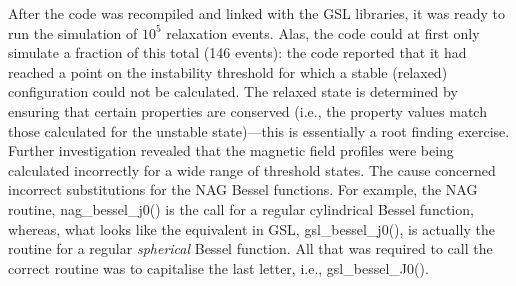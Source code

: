 After the code was recompiled and linked with the GSL libraries, it was ready to run the simulation of $10^5$ relaxation events. Alas, the code could at first only simulate a fraction of this total (146 events): the code reported that it had reached a point on the instability threshold for which a stable (relaxed) configuration could not be calculated. The relaxed state is determined by ensuring that certain properties are conserved (i.e., the property values match those calculated for the unstable state)---this is essentially a root finding exercise. Further investigation revealed that the magnetic field profiles were being calculated incorrectly for a wide range of threshold states. The cause concerned incorrect substitutions for the NAG Bessel functions. For example, the NAG routine, nag\_bessel\_j0() is the call for a regular cylindrical Bessel function, whereas, what looks like the equivalent in GSL, gsl\_bessel\_j0(), is actually the routine for a regular \textit{spherical} Bessel function. All that was required to call the correct routine was to capitalise the last letter, i.e., gsl\_bessel\_J0().
 
